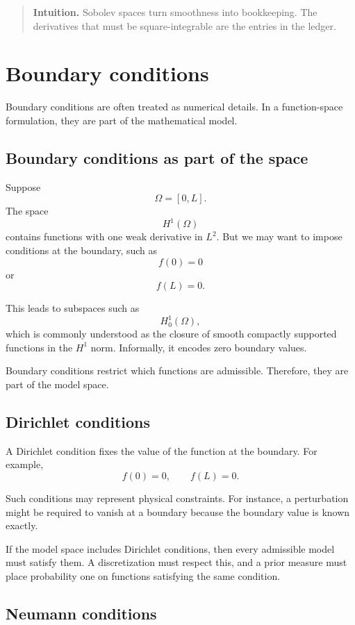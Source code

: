 \documentclass[11pt,a4paper]{book}
\newenvironment{intuition}
  {\begin{quote}\textbf{Intuition.}}
  {\end{quote}}
\begin{document}
\begin{intuition}
Sobolev spaces turn smoothness into bookkeeping. The derivatives that must be
square-integrable are the entries in the ledger.
\end{intuition}

\section{Boundary conditions}

Boundary conditions are often treated as numerical details. In a function-space
formulation, they are part of the mathematical model.

\subsection{Boundary conditions as part of the space}

Suppose
\[
    \Omega=[0,L].
\]
The space
\[
    H^1(\Omega)
\]
contains functions with one weak derivative in $L^2$. But we may want to impose
conditions at the boundary, such as
\[
    f(0)=0
\]
or
\[
    f(L)=0.
\]

This leads to subspaces such as
\[
    H_0^1(\Omega),
\]
which is commonly understood as the closure of smooth compactly supported
functions in the $H^1$ norm. Informally, it encodes zero boundary values.

Boundary conditions restrict which functions are admissible. Therefore, they
are part of the model space.

\subsection{Dirichlet conditions}

A Dirichlet condition fixes the value of the function at the boundary. For
example,
\[
    f(0)=0,
    \qquad
    f(L)=0.
\]

Such conditions may represent physical constraints. For instance, a perturbation
might be required to vanish at a boundary because the boundary value is known
exactly.

If the model space includes Dirichlet conditions, then every admissible model
must satisfy them. A discretization must respect this, and a prior measure must
place probability one on functions satisfying the same condition.

\subsection{Neumann conditions}
\end{document}
